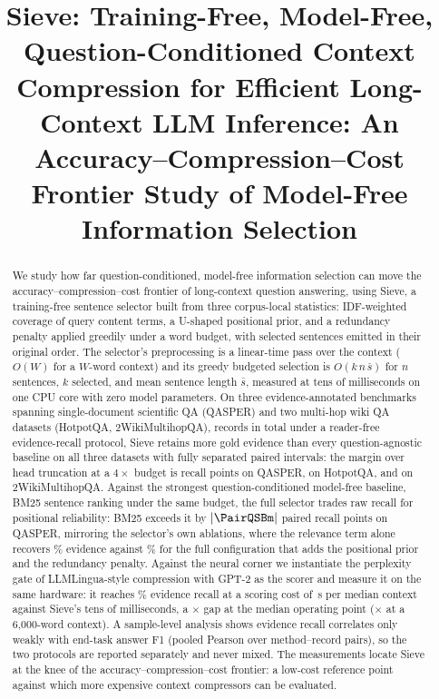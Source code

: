 \documentclass[review,12pt]{elsarticle}
\DeclarePairedDelimiter\abs{\lvert}{\rvert}
\theoremstyle{remark}
\newcommand{\method}{Sieve}
\begin{document}
\begin{frontmatter}

\title{Sieve: Training-Free, Model-Free, Question-Conditioned Context
Compression for Efficient Long-Context LLM Inference: An
Accuracy--Compression--Cost Frontier Study of Model-Free Information
Selection}

\begin{abstract}
We study how far question-conditioned, model-free information selection
can move the accuracy--compression--cost frontier of long-context
question answering, using \method{}, a training-free sentence selector
built from three corpus-local statistics: IDF-weighted coverage of
query content terms, a U-shaped positional prior, and a redundancy
penalty applied greedily under a word budget, with selected sentences
emitted in their original order. The selector's preprocessing is a
linear-time pass over the context ($O(W)$ for a $W$-word context) and
its greedy budgeted selection is $O(k\,n\,\bar{s})$ for $n$ sentences,
$k$ selected, and mean sentence length $\bar{s}$, measured at tens of
milliseconds on one CPU core with zero model parameters. On three
evidence-annotated benchmarks spanning single-document scientific QA
(QASPER) and two multi-hop wiki QA datasets (HotpotQA,
2WikiMultihopQA), \TotalRecords{} records in total under a reader-free
evidence-recall protocol, \method{} retains more gold evidence than
every question-agnostic baseline on all three datasets with fully
separated paired intervals: the margin over head truncation at a
$4\times$ budget is \PairQSH{} recall points on QASPER, \PairHSH{} on
HotpotQA, and \PairWSH{} on 2WikiMultihopQA. Against the strongest
question-conditioned model-free baseline, BM25 sentence ranking under
the same budget, the full selector trades raw recall for positional
reliability: BM25 exceeds it by $\abs{\PairQSBm}$ paired recall
points on QASPER, mirroring the selector's own ablations, where the
relevance term alone recovers \AblRelOnly\% evidence against
\AblSie\% for the full configuration that adds the positional prior
and the redundancy penalty. Against the neural corner we instantiate
the perplexity gate of LLMLingua-style compression with GPT-2 as the
scorer and measure it on the same hardware: it reaches
\GateRecall\% evidence recall at a scoring cost of
\GateLatMedCtxS\,s per median context against \method{}'s tens of
milliseconds, a \GateSieRatioMed$\times$ gap at the median operating
point (\GateSieRatioSixk$\times$ at a 6{,}000-word context). A
sample-level analysis shows evidence recall correlates only weakly
with end-task answer F1 (pooled Pearson \CorrPearson{} over
\CorrNPairs{} method--record pairs), so the two protocols are reported
separately and never mixed. The measurements locate \method{} at the
knee of the accuracy--compression--cost frontier: a low-cost reference
point against which more expensive context compressors can be
evaluated.
\end{abstract}


\end{frontmatter}
\end{document}
